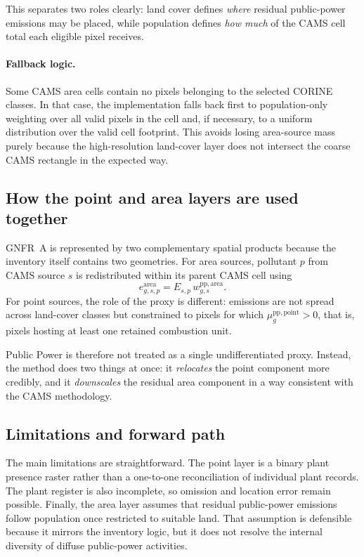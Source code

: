 This separates two roles clearly: land cover defines \emph{where} residual
public-power emissions may be placed, while population defines \emph{how much}
of the CAMS cell total each eligible pixel receives.

\paragraph{Fallback logic.}
Some CAMS area cells contain no pixels belonging to the selected CORINE
classes. In that case, the implementation falls back first to
population-only weighting over all valid pixels in the cell and, if necessary,
to a uniform distribution over the valid cell footprint. This avoids losing
area-source mass purely because the high-resolution land-cover layer does not
intersect the coarse CAMS rectangle in the expected way.

\subsection{How the point and area layers are used together}

GNFR~A is represented by two complementary spatial products because the
inventory itself contains two geometries. For area sources, pollutant $p$ from
CAMS source $s$ is redistributed within its parent CAMS cell using
\begin{equation}
  e_{g,s,p}^{\mathrm{area}} = E_{s,p} \, w_{g,s}^{\mathrm{pp,area}}.
\end{equation}
For point sources, the role of the proxy is different: emissions are not
spread across land-cover classes but constrained to pixels for which
\(\mu_{g}^{\mathrm{pp,point}} > 0\), that is, pixels hosting at least one
retained combustion unit.

Public Power is therefore not treated as a single undifferentiated proxy.
Instead, the method does two things at once: it \emph{relocates} the point
component more credibly, and it \emph{downscales} the residual area component
in a way consistent with the CAMS methodology.

\subsection{Limitations and forward path}

The main limitations are straightforward. The point layer is a binary plant
presence raster rather than a one-to-one reconciliation of individual plant
records. The plant register is also incomplete, so omission and location error
remain possible. Finally, the area layer assumes that residual public-power
emissions follow population once restricted to suitable land. That assumption
is defensible because it mirrors the inventory logic, but it does not resolve
the internal diversity of diffuse public-power activities.
